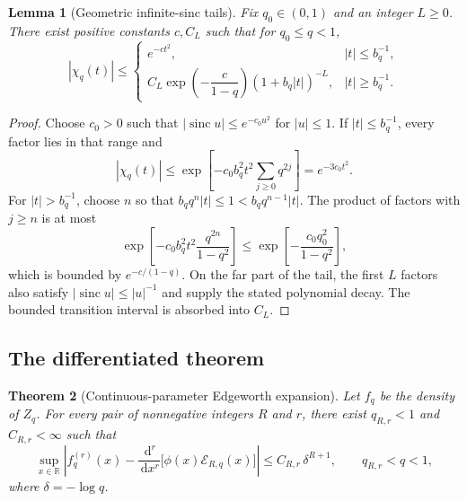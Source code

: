 \documentclass[11pt,a4paper]{article}
\newtheorem{theorem}{Theorem}[section]
\newtheorem{lemma}[theorem]{Lemma}
\theoremstyle{definition}
\newcommand{\R}{\mathbb{R}}
\newcommand{\sinc}{\operatorname{sinc}}
\newcommand{\dd}{\,\mathrm{d}}
\newcommand{\1}{\mathbf{1}}
\begin{document}
\begin{lemma}[Geometric infinite-sinc tails]
\label{lem:sinc-tail}
Fix $q_0\in(0,1)$ and an integer $L\ge0$.  There exist positive constants
$c,C_L$ such that for $q_0\le q<1$,
\begin{equation}
 |\chi_q(t)|\le
 \begin{cases}
   e^{-ct^2},& |t|\le b_q^{-1},\\[1mm]
   C_L\exp\!\left(-\dfrac{c}{1-q}\right)
   (1+b_q|t|)^{-L},& |t|\ge b_q^{-1}.
 \end{cases}
 \label{eq:sinc-tail-bound}
\end{equation}
\end{lemma}

\begin{proof}
Choose $c_0>0$ such that
$|\sinc u|\le e^{-c_0u^2}$ for $|u|\le1$.  If
$|t|\le b_q^{-1}$, every factor lies in that range and
\[
 |\chi_q(t)|\le
 \exp\left[-c_0b_q^2t^2\sum_{j\ge0}q^{2j}\right]
 =e^{-3c_0t^2}.
\]
For $|t|>b_q^{-1}$, choose $n$ so that
$b_qq^n|t|\le1<b_qq^{n-1}|t|$.  The product of factors with $j\ge n$ is at
most
\[
 \exp\left[-c_0b_q^2t^2\frac{q^{2n}}{1-q^2}\right]
 \le \exp\left[-\frac{c_0q_0^2}{1-q^2}\right],
\]
which is bounded by $e^{-c/(1-q)}$.  On the far part of the tail, the first
$L$ factors also satisfy $|\sinc u|\le|u|^{-1}$ and supply the stated
polynomial decay.  The bounded transition interval is absorbed into $C_L$.
\end{proof}

\subsection{The differentiated theorem}

\begin{theorem}[Continuous-parameter Edgeworth expansion]
\label{thm:Edgeworth}
Let $f_q$ be the density of $Z_q$.  For every pair of nonnegative integers
$R$ and $r$, there exist $q_{R,r}<1$ and $C_{R,r}<\infty$ such that
\begin{equation}
 \sup_{x\in\R}
 \left|
 f_q^{(r)}(x)-
 \frac{\dd^r}{\dd x^r}
 \bigl[\phi(x)\mathcal E_{R,q}(x)\bigr]
 \right|
 \le C_{R,r}\,\delta^{R+1},
 \qquad q_{R,r}<q<1,
 \label{eq:Edgeworth-theorem}
\end{equation}
where $\delta=-\log q$.
\end{theorem}
\end{document}

